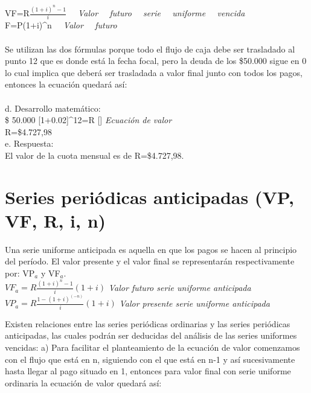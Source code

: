 {	\\\\
	VF=R$\frac{(1+i)^{n}-1}{i}$ \hspace{35}\textit{ \ \ Valor \ \ futuro \ \ serie \ \ uniforme \ \ vencida} \\
	
	F=P(1+i)^{n} \hspace{55}\textit{ \ \ Valor \ \ futuro \\}\\


Se utilizan las dos fórmulas porque todo el flujo de caja debe ser trasladado al punto 12 que es donde está la fecha focal, pero la deuda de los \$50.000 sigue en 0 lo cual implica que deberá ser trasladada a valor final junto con todos los pagos, entonces la ecuación quedará así:
\\\\
d. Desarrollo matemático:\\

	\$ 50.000 [1+0.02]^{12}=R [] \hspace{35}\textit{Ecuación de valor}
	\\
	R=\$4.727,98\\

e. Respuesta:\\

El valor de la cuota mensual es de R=\$4.727,98.

\section{Series periódicas anticipadas (VP, VF, R, i, n)}

Una serie uniforme anticipada es aquella en que los pagos se hacen al principio del período. El valor presente y el valor final se representarán respectivamente por: VP$_{a}$ y VF$_{a}$.\\


	$VF_{a}=R \frac{(1+i)^{n}-1}{i}(1+i) $ \hspace{35}\textit{ Valor  futuro  serie  uniforme  anticipada}
	\\
	$VP_{a}=R \frac{1-(1+i)^{(-n)}}{i}(1+i)$
	\hspace{30}\textit{Valor  presente  serie  uniforme  anticipada}\\

\clearpage

Existen relaciones entre las series periódicas ordinarias y las series periódicas anticipadas, las cuales podrán ser deducidas del análisis de las series uniformes vencidas: a) Para facilitar el planteamiento de la ecuación de valor comenzamos con el flujo que está en n, siguiendo con el que está en n-1 y así sucesivamente hasta llegar al pago situado en 1, entonces para valor final con serie uniforme ordinaria la ecuación de valor quedará así:

}

